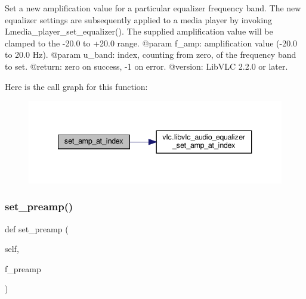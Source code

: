 \begin{DoxyVerb}Set a new amplification value for a particular equalizer frequency band.
The new equalizer settings are subsequently applied to a media player by invoking
L{media_player_set_equalizer}().
The supplied amplification value will be clamped to the -20.0 to +20.0 range.
@param f_amp: amplification value (-20.0 to 20.0 Hz).
@param u_band: index, counting from zero, of the frequency band to set.
@return: zero on success, -1 on error.
@version: LibVLC 2.2.0 or later.
\end{DoxyVerb}
 Here is the call graph for this function\+:
\nopagebreak
\begin{figure}[H]
\begin{center}
\leavevmode
\includegraphics[width=340pt]{classvlc_1_1_audio_equalizer_aab7e0f4d960155c9ae37a54e56991124_cgraph}
\end{center}
\end{figure}
\mbox{\label{classvlc_1_1_audio_equalizer_ab88c103714ca495bcaabdc3d8d6b0986}} 
\subsubsection{\texorpdfstring{set\+\_\+preamp()}{set\_preamp()}}
{\footnotesize\ttfamily def set\+\_\+preamp (\begin{DoxyParamCaption}\item[{}]{self,  }\item[{}]{f\+\_\+preamp }\end{DoxyParamCaption})}

